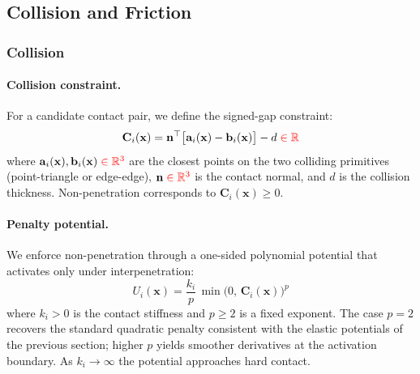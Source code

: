 \documentclass{article}
\newcommand{\red}[1]{\textcolor{red}{#1}}
\begin{document}
\subsection{Collision and Friction}
\label{sec:primal_collision_friction}

\subsubsection{Collision}
\paragraph{Collision constraint.}
For a candidate contact pair, we define the signed-gap constraint:
\begin{equation}
    \mathbf{C}_i(\mathbf{x}) = \mathbf{n}^\top\bigl[\mathbf{a}_i(\mathbf{x}) - \mathbf{b}_i(\mathbf{x})\bigr] - d \;\red{\in \mathbb{R}}
\end{equation}
where $\mathbf{a}_i(\mathbf{x}), \mathbf{b}_i(\mathbf{x})\; \red{\in \mathbb{R}^3}$ are the closest points on the two colliding primitives (point-triangle or edge-edge), $\mathbf{n}\;\red{\in \mathbb{R}^3}$ is the contact normal, and $d$ is the collision thickness. Non-penetration corresponds to $\mathbf{C}_i(\mathbf{x}) \geq 0$.

\paragraph{Penalty potential.}
We enforce non-penetration through a one-sided polynomial potential that activates only under interpenetration:
\begin{equation}
    U_i(\mathbf{x}) = \frac{k_i}{p}\,\min\bigl(0,\, \mathbf{C}_i(\mathbf{x})\bigr)^p
\end{equation}
where $k_i > 0$ is the contact stiffness and $p \geq 2$ is a fixed exponent. The case $p = 2$ recovers the standard quadratic penalty consistent with the elastic potentials of the previous section; higher $p$ yields smoother derivatives at the activation boundary. As $k_i \to \infty$ the potential approaches hard contact.
\end{document}
